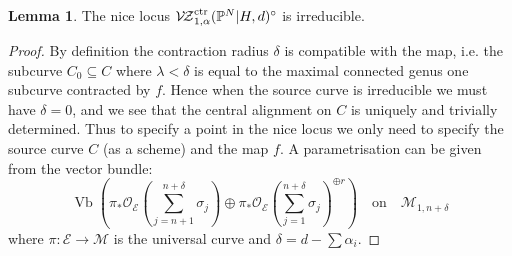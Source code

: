 \documentclass[11pt]{amsart}
\newcommand{\PP}{\mathbb P}
\newcommand{\VZcrel}{{\mathcal{V\!Z}}^{\rm{ctr}}_{1,\alpha}}
\newcommand{\OO}{\mathcal{O}}
\renewcommand{\to}{\rightarrow}
\theoremstyle{definition}
\newtheorem{lem}[thm]{Lemma}
\theoremstyle{definition}
\begin{document}
\begin{lem}\label{Nice locus is irreducible}
The nice locus $\VZcrel(\PP^N|H,d)^{\circ}$ is irreducible.
\end{lem}
\begin{proof}
By definition the contraction radius $\delta$ is compatible with the map, i.e. the subcurve $C_0\subseteq C$ where $\lambda<\delta$ is equal to the maximal connected genus one subcurve contracted by $f$. Hence when the source curve is irreducible we must have $\delta=0$, and we see that the central alignment on $C$ is uniquely and trivially determined. Thus to specify a point in the nice locus we only need to specify the source curve $C$ (as a scheme) and the map $f$. A parametrisation can be given from the vector bundle:
\[ \operatorname{Vb}\left(\pi_*\OO_{\mathcal E}(\sum_{j=n+1}^{n+\delta}\sigma_j)\oplus\pi_*\OO_{\mathcal E}(\sum_{j=1}^{n+\delta}\sigma_j)^{\oplus r}\right) \quad \text{on} \quad \mathcal{M}_{1,n+\delta}\]
where $\pi\colon\mathcal E\to\mathcal M$ is the universal curve and $\delta=d-\sum\alpha_i$.
\end{proof}
\end{document}
